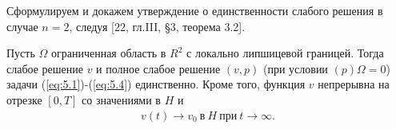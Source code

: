 Сформулируем и докажем утверждение о единственности слабого решения в случае $n = 2$, следуя [22, гл.III, \S 3, теорема 3.2].

\begin{theorem}
    Пусть $\Omega$ ограниченная область в $R^2$ с локально липшицевой границей. Тогда слабое решение $v$ и полное слабое решение $(v, p)$
    (при условии $(p) \Omega = 0$) задачи (\ref{eq:5.1})-(\ref{eq:5.4}) единственно. Кроме того, функция $v$ непрерывна на отрезке $[0, T]$ со значениями в $H$ и
    \begin{equation}\label{eq:5.35}
        \begin{gathered}
            v(t) \rightarrow v_0 \ \textrm{в} \ H \ \textrm{при} \ t \rightarrow \infty.
        \end{gathered}
    \end{equation}
\end{theorem}
